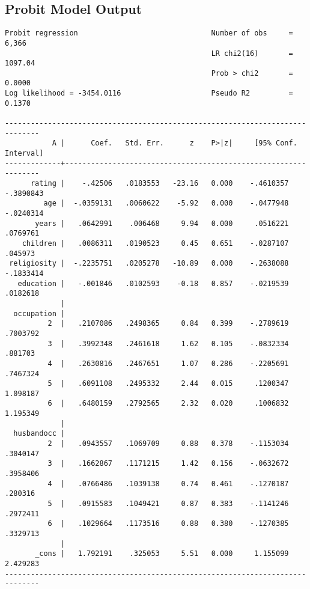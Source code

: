\documentclass{article}
\begin{document}
\hypertarget{probitoutput}{\subsection*{Probit Model Output}}
\begin{verbatim}
Probit regression                               Number of obs     =      6,366
                                                LR chi2(16)       =    1097.04
                                                Prob > chi2       =     0.0000
Log likelihood = -3454.0116                     Pseudo R2         =     0.1370

------------------------------------------------------------------------------
           A |      Coef.   Std. Err.      z    P>|z|     [95% Conf. Interval]
-------------+----------------------------------------------------------------
      rating |    -.42506   .0183553   -23.16   0.000    -.4610357   -.3890843
         age |  -.0359131   .0060622    -5.92   0.000    -.0477948   -.0240314
       years |   .0642991    .006468     9.94   0.000     .0516221    .0769761
    children |   .0086311   .0190523     0.45   0.651    -.0287107     .045973
 religiosity |  -.2235751   .0205278   -10.89   0.000    -.2638088   -.1833414
   education |   -.001846   .0102593    -0.18   0.857    -.0219539    .0182618
             |
  occupation |
          2  |   .2107086   .2498365     0.84   0.399    -.2789619    .7003792
          3  |   .3992348   .2461618     1.62   0.105    -.0832334     .881703
          4  |   .2630816   .2467651     1.07   0.286    -.2205691    .7467324
          5  |   .6091108   .2495332     2.44   0.015     .1200347    1.098187
          6  |   .6480159   .2792565     2.32   0.020     .1006832    1.195349
             |
  husbandocc |
          2  |   .0943557   .1069709     0.88   0.378    -.1153034    .3040147
          3  |   .1662867   .1171215     1.42   0.156    -.0632672    .3958406
          4  |   .0766486   .1039138     0.74   0.461    -.1270187     .280316
          5  |   .0915583   .1049421     0.87   0.383    -.1141246    .2972411
          6  |   .1029664   .1173516     0.88   0.380    -.1270385    .3329713
             |
       _cons |   1.792191    .325053     5.51   0.000     1.155099    2.429283
------------------------------------------------------------------------------
\end{verbatim}
\end{document}
